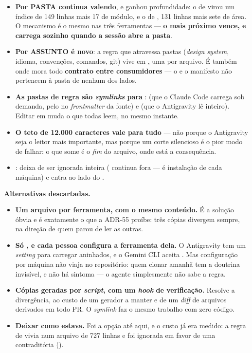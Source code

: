 \begin{itemize}
  \item \textbf{Por PASTA continua valendo}, e ganhou profundidade: o
     de  virou um índice de 149 linhas mais 17
     de módulo, e o de , 131 linhas mais sete de
    área. O mecanismo é o mesmo nas três ferramentas --- \textbf{o mais próximo
    vence, e carrega sozinho quando a sessão abre a pasta}.
  \item \textbf{Por ASSUNTO é novo}: a regra que atravessa pastas (\emph{design
    system}, idioma, convenções, comandos, git) vive em , uma
    por arquivo. É também onde mora todo \textbf{contrato entre consumidores}
    --- o  e o manifesto não pertencem à pasta de nenhum dos
    lados.
  \item \textbf{As pastas de regra são \emph{symlinks} para
    }:  (que o Claude Code carrega sob
    demanda, pelo  no \emph{frontmatter} da fonte) e
     (que o Antigravity lê inteiro). Editar em
     muda o que todas leem, no mesmo instante.
  \item \textbf{O teto de 12.000 caracteres vale para tudo} --- não porque o
    Antigravity seja o leitor mais importante, mas porque um corte silencioso é
    o pior modo de falhar: o que some é o \emph{fim} do arquivo, onde está a
    consequência.
  \item {}:  deixa de ser ignorada inteira
    ( continua fora --- é instalação de cada máquina) e
     entra ao lado do .
\end{itemize}

\textbf{Alternativas descartadas.}

\begin{itemize}
  \item \textbf{Um arquivo por ferramenta, com o mesmo conteúdo.} É a solução
    óbvia e é exatamente o que a ADR-55 proíbe: três cópias divergem sempre, na
    direção de quem parou de ler as outras.
  \item \textbf{Só , e cada pessoa configura a ferramenta dela.}
    O Antigravity tem um \emph{setting} para carregar 
    aninhados, e o Gemini CLI aceita . Mas configuração
    por máquina não viaja no repositório: quem clonar amanhã tem a doutrina
    invisível, e não há sintoma --- o agente simplesmente não sabe a regra.
  \item \textbf{Cópias geradas por \emph{script}, com um \emph{hook} de
    verificação.} Resolve a divergência, ao custo de um gerador a manter e de
    um \emph{diff} de arquivos derivados em todo PR. O \emph{symlink} faz o
    mesmo trabalho com zero código.
  \item \textbf{Deixar como estava.} Foi a opção até aqui, e o custo já era
    medido: a regra de  vivia num arquivo de 727 linhas e foi
    ignorada em favor de uma contraditória ().
\end{itemize}

